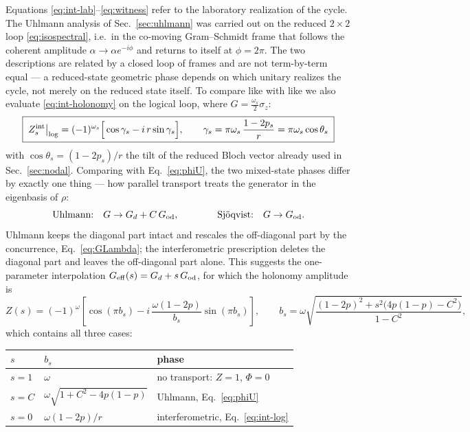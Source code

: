 \documentclass[11pt]{article}
\begin{document}
Equations \eqref{eq:int-lab}--\eqref{eq:witness} refer to the laboratory
realization of the cycle. The Uhlmann analysis of Sec.~\ref{sec:uhlmann} was
carried out on the reduced $2\times2$ loop \eqref{eq:isospectral}, i.e.\ in the
co-moving Gram--Schmidt frame that follows the coherent amplitude
$\alpha\to\alpha e^{-i\phi}$ and returns to itself at $\phi=2\pi$. The two
descriptions are related by a closed loop of frames and are not term-by-term
equal --- a reduced-state geometric phase depends on which unitary realizes the
cycle, not merely on the reduced state itself. To compare like with like we
also evaluate \eqref{eq:int-holonomy} on the logical loop, where
$G=\tfrac{\omega_s}{2}\sigma_z$:
\begin{equation}
\boxed{\;Z^{\rm int}_s\big|_{\rm log}=(-1)^{\omega_s}
\Big[\cos\gamma_s-i\,r\sin\gamma_s\Big],\qquad
\gamma_s=\pi\omega_s\,\frac{1-2p_s}{r}=\pi\omega_s\cos\theta_s\;}
\label{eq:int-log}
\end{equation}
with $\cos\theta_s=(1-2p_s)/r$ the tilt of the reduced Bloch vector already
used in Sec.~\ref{sec:nodal}. Comparing with Eq.~\eqref{eq:phiU}, the two
mixed-state phases differ by exactly one thing --- how parallel transport
treats the generator in the eigenbasis of $\rho$:
\begin{equation}
\text{Uhlmann:}\quad G\to G_d+C\,G_{\rm od},
\qquad\qquad
\text{Sj\"oqvist:}\quad G\to G_{\rm od} .
\label{eq:two-transports}
\end{equation}
Uhlmann keeps the diagonal part intact and rescales the off-diagonal part by
the concurrence, Eq.~\eqref{eq:GLambda}; the interferometric prescription
deletes the diagonal part and leaves the off-diagonal part alone. This
suggests the one-parameter interpolation $G_{\rm eff}(s)=G_d+s\,G_{\rm od}$,
for which the holonomy amplitude is
\begin{equation}
Z(s)=(-1)^{\omega}\left[\cos(\pi b_s)
-i\,\frac{\omega(1-2p)}{b_s}\sin(\pi b_s)\right],\qquad
b_s=\omega\sqrt{\frac{(1-2p)^2+s^2\big(4p(1-p)-C^2\big)}{1-C^2}} ,
\label{eq:Zs}
\end{equation}
which contains all three cases:
\begin{center}
\begin{tabular}{lll}
\toprule
$s$ & $b_s$ & phase\\
\midrule
$s=1$ & $\omega$ & no transport: $Z=1$, $\Phi=0$\\
$s=C$ & $\omega\sqrt{1+C^2-4p(1-p)}$ & Uhlmann, Eq.~\eqref{eq:phiU}\\
$s=0$ & $\omega(1-2p)/r$ & interferometric, Eq.~\eqref{eq:int-log}\\
\bottomrule
\end{tabular}
\end{center}
\end{document}
